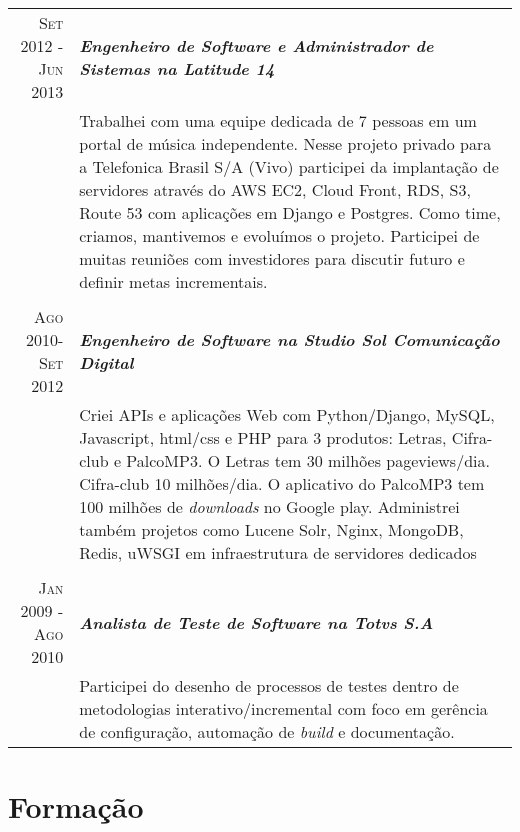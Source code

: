 \documentclass[a4paper,10pt]{article} %
\begin{document}
\begin{tabular}{r|p{11cm}}
\textsc{Set 2012 - Jun 2013} & \emph{\bf Engenheiro de Software e Administrador
de Sistemas na Latitude 14} \\
& \footnotesize{Trabalhei com uma equipe dedicada de 7 pessoas em um portal de
    música independente. Nesse projeto privado para a Telefonica Brasil S/A
    (Vivo) participei da implantação de servidores através do AWS EC2, Cloud
    Front, RDS, S3, Route 53 com aplicações em Django e Postgres. Como time,
    criamos, mantivemos e evoluímos o projeto. Participei de muitas reuniões
    com investidores para discutir futuro e definir metas incrementais.} \\
\multicolumn{2}{c}{} \\


\textsc{Ago 2010-Set 2012} & \emph{\bf Engenheiro de Software na
Studio Sol Comunicação Digital}  \\
& \footnotesize{Criei APIs e aplicações Web com Python/Django, MySQL,
    Javascript, html/css e PHP para 3 produtos: Letras, Cifra-club e PalcoMP3.
    O Letras tem 30 milhões pageviews/dia. Cifra-club 10 milhões/dia. O
    aplicativo do PalcoMP3 tem 100 milhões de \emph{downloads} no Google play.
    Administrei também projetos como Lucene Solr, Nginx, MongoDB, Redis, uWSGI
    em infraestrutura de servidores dedicados
}\\
\multicolumn{2}{c}{} \\


\textsc{Jan 2009 - Ago 2010} & \emph{\bf Analista de Teste de Software
na Totvs S.A} \\
& \footnotesize{Participei do desenho de processos de testes dentro de
metodologias interativo/incremental com foco em gerência de configuração,
automação de \emph{build} e documentação.}
\end{tabular}





\section{Formação}
\end{document}
